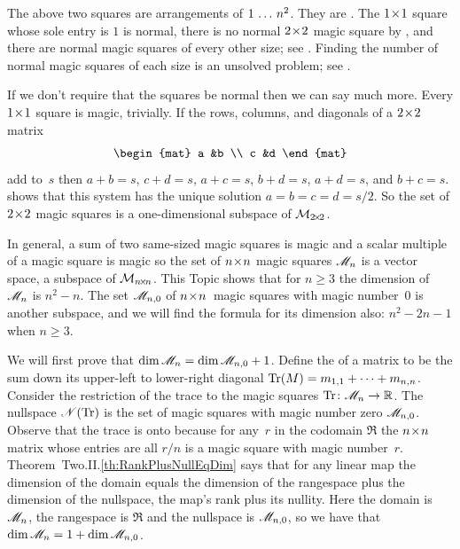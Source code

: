 The above two squares are arrangements of $1\,\ldots\, n^2$.
They are .
The $1 \! \times \! 1$ square whose sole entry is $1$ is normal, there is
no normal $2 \! \times \! 2$ magic square by ,
and there are normal magic squares of every other size; 
see \cite{WikipediaMagicSquare}.
Finding the number of normal magic squares of each size is an unsolved
problem;
see \cite{OnlineEncyclopedia}.
 
If we don't require that the squares be normal then we can say much more.
Every $1 \! \times \! 1$ square is magic, trivially.
If the rows, columns, and diagonals of a $2 \! \times \! 2$ matrix 
\begin{equation*}
  \begin{mat}
    a  &b  \\
    c  &d
  \end{mat}
\end{equation*}
add to~$s$
then $a+b=s$, $c+d=s$, $a+c=s$, $b+d=s$, $a+d=s$, and $b+c=s$.
 shows that this
system has the unique solution $a=b=c=d=s/2$.
So the set of $2 \! \times \! 2$ magic squares
is a one-dimensional subspace of $\mathcal{M}_{2 \! \times \! 2}$.

In general, a sum of two same-sized magic squares is magic and a 
scalar multiple of a magic square is magic so the set of 
$n \! \times \! n$ magic squares
$\mathscr{M}_n$ is a vector space, a subspace of $\mathcal{M}_{n \! \times \! n}$.
This Topic shows that for $n\geq 3$ the 
dimension of
$\mathscr{M}_n$ is $n^2-n$.
The set $\mathscr{M}_{n,0}$ of $n \! \times \! n$~magic squares with magic number~$0$ 
is another subspace, and we will find the formula for its dimension also:
$n^2-2n-1$ when $n\geq 3$.

We will first prove that $\dim\mathscr{M}_n=\dim\mathscr{M}_{n,0}+1$.
Define the 
 of a matrix to be
the sum down its upper-left to lower-right diagonal
$\operatorname{Tr} (M)=m_{1,1}+\cdots+m_{n,n}$.
Consider the restriction of the trace to the magic squares
$\mbox{$\operatorname{Tr}\colon \mathscr{M}_n\to \mathbb{R}$}$. 
The nullspace $\mathscr{N}(\operatorname{Tr})$ is the set of magic squares with magic
number zero 
$\mathscr{M}_{n,0}$.
Observe that the trace is onto because for any~$r$ in the 
codomain $\Re$ the $n \! \times \! n$ matrix whose entries are all $r/n$ is
a magic square with magic number~$r$.
Theorem~Two.II.\ref{th:RankPlusNullEqDim} says that for any linear map the
dimension of the domain equals the dimension of the rangespace 
plus the dimension of the nullspace,
the map's rank plus its nullity.
Here the domain is $\mathscr{M}_n$, the rangespace is 
$\Re$ and the nullspace is $\mathscr{M}_{n,0}$,
so we have that $\dim\mathscr{M}_n=1+\dim\mathscr{M}_{n,0}$.

